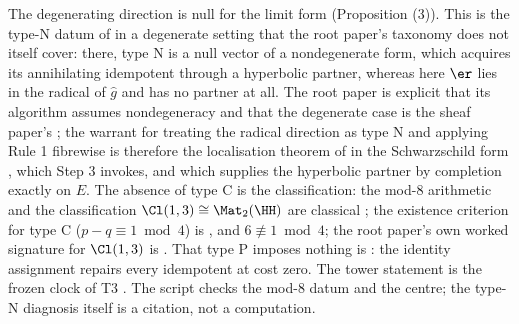 The degenerating direction is null for the limit form (Proposition (3)). This is the type-N datum of \cite[Def.~3.1, Prop.~3.3]{ButlerT1} in a degenerate setting that the root paper's taxonomy does not itself cover: there, type N is a null vector of a nondegenerate form, which acquires its annihilating idempotent through a hyperbolic partner, whereas here $\er$ lies in the radical of $\hat g$ and has no partner at all. The root paper is explicit that its algorithm assumes nondegeneracy and that the degenerate case is the sheaf paper's \cite[Rem.~4.15, Rem.~8.4]{ButlerT1}; the warrant for treating the radical direction as type N and applying Rule 1 fibrewise is therefore the localisation theorem of \cite[Thm.~4.4, Cor.~4.5]{ButlerT4} in the Schwarzschild form \cite[Thms 8.7, 8.12]{ButlerT4}, which Step 3 invokes, and which supplies the hyperbolic partner by completion exactly on $E$. The absence of type C is the classification: the mod-8 arithmetic and the classification $\Cl(1,3) \cong \Mat_2(\HH)$ are classical \cite{Porteous1995}; the existence criterion for type C ($p - q \equiv 1 \bmod 4$) is \cite[Thm.~3.6]{ButlerT1}, and $6 \not\equiv 1 \bmod 4$; the root paper's own worked signature for $\Cl(1,3)$ is \cite[Ex.~3.12]{ButlerT1}. That type P imposes nothing is \cite[Prop.~6.1]{ButlerT1}: the identity assignment repairs every idempotent at cost zero. The tower statement is the frozen clock of T3 \cite{ButlerT3}. The script checks the mod-8 datum and the centre; the type-N diagnosis itself is a citation, not a computation.

